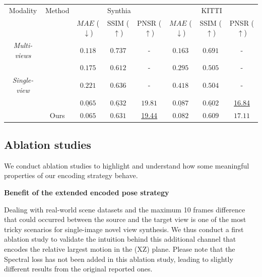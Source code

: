 \begin{table}[htp!]
\begin{center}
\begin{adjustbox}{max width=\textwidth}
\begin{tabular}[h]{c||ccccccc}
\hline
Modality &Method & \multicolumn{3}{c}{Synthia} & \multicolumn{3}{c}{KITTI} \\
& & $MAE$ ($\downarrow$) & SSIM ($\uparrow$)& PNSR ($\uparrow$) & $MAE$ ($\downarrow$) & SSIM ($\uparrow$) & PNSR ($\uparrow$)\\
\hline
\textit{Multi-views}&\citep{sun2018multiview} & $0.118$ & $0.737$ & - &  $0.163$ & $0.691$ & - \\
\hline
&\citep{tatarchenko2015single} & $0.175$ & $0.612$ & - &  $0.295$ & $0.505$ &  - \\
\textit{Single-view} & \citep{zhou2016view} & $0.221$ & $\mathbf{0.636}$ & -  & $0.418$ & $0.504$ & - \\
 & \citep{kim2020novel}  & $\underline{0.065}$ & $\underline{0.632}$ & $\mathbf{19.81}$ & $\underline{0.087}$ & $\underline{0.602}$ & \underline{16.84} \\
& Ours & $\mathbf{0.065}$ & $0.631$ & \underline{19.44} & $\mathbf{0.082}$ & $\mathbf{0.609}$ & $\mathbf{17.11}$ \\
\hline\hline
\end{tabular}
\end{adjustbox}
\end{center}
\label{tab:2}
\end{table}


\subsection{Ablation studies}
\label{sec:ablation}
We conduct ablation studies to highlight and understand how some meaningful properties of our encoding strategy behave. \newline

\textbf{Benefit of the extended encoded pose strategy}

Dealing with real-world scene datasets and the maximum 10 frames difference that could occurred between the source and the target view is one of the most tricky scenarios for single-image novel view synthesis. We thus conduct a first ablation study to validate the intuition behind this additional channel that encodes the relative largest motion in the (XZ) plane. Please note that the Spectral loss has not been added in this ablation study, leading to slightly different results from the original reported ones. 

